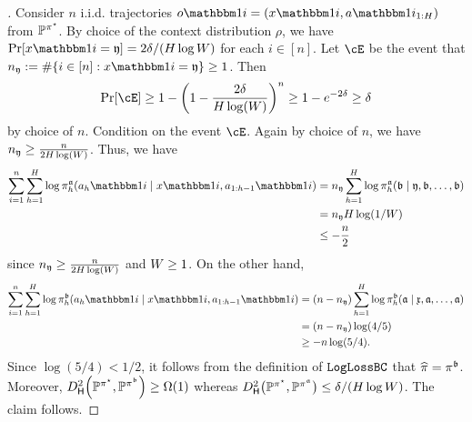 \begin{proof}[]
  
  Consider $n$ i.i.d. trajectories $o\ind{i} = (x\ind{i},a\ind{i}_{1:H})$ from $\mathbb{P}^{\pi^{\star}}$. By choice of the context distribution $\rho$, we have $\Pr[x\ind{i}=\yfrak] = 2\delta/(H\log \denbound)$ for each $i \in [n]$. Let $\cE$ be the event that $n_\yfrak := \#\{i \in [n]: x\ind{i} = \yfrak\} \geq 1$. Then 
  \[\Pr[\cE] \geq 1 - \left(1 - \frac{2\delta}{H\log(\denbound)}\right)^n \geq 1 - e^{-2\delta} \geq \delta\]
  by choice of $n$. Condition on the event $\cE$. Again by choice of $n$, we have $n_{\mathfrak{y}} \geq \frac{n}{2H\log(W)}$. Thus, we have
  \begin{align} 
  \sum_{i=1}^n \sum_{h=1}^H \log \pia_h(a_h\ind{i} \mid{} x\ind{i}, a_{1:h-1}\ind{i})
  &= n_\yfrak \sum_{h=1}^H \log \pia_h(\bfrak \mid{} \yfrak, \bfrak,\dots,\bfrak) \\ 
  &= n_\yfrak H \log (1/\denbound) \\ 
  &\leq -\frac{n}{2}
  \end{align} 
  since $n_{\mathfrak{y}} \geq \frac{n}{2H\log(W)}$ and $W \geq 1$. On the other hand,
  \begin{align}
  \sum_{i=1}^n \sum_{h=1}^H \log \pib_h(a_h\ind{i} \mid{} x\ind{i}, a_{1:h-1}\ind{i})
  &= (n-n_\yfrak) \sum_{h=1}^H \log \pib_h(\afrak \mid{} \xfrak, \afrak,\dots,\afrak) \\
  &= (n-n_\yfrak) \log(4/5) \\
  &\geq -n\log(5/4).
  \end{align}
  Since $\log(5/4) < 1/2$, it follows from the definition of $\texttt{LogLossBC}$ that $\widehat{\pi} = \pi^{\mathfrak{b}}$. Moreover, $\Dhels{\BP^{\pistar}}{\BP^{\pib}} \geq \Omega(1)$ whereas $\Dhels{\BP^{\pistar}}{\BP^{\pia}} \leq \delta/(H\log \denbound)$. The claim follows.
  \end{proof}

